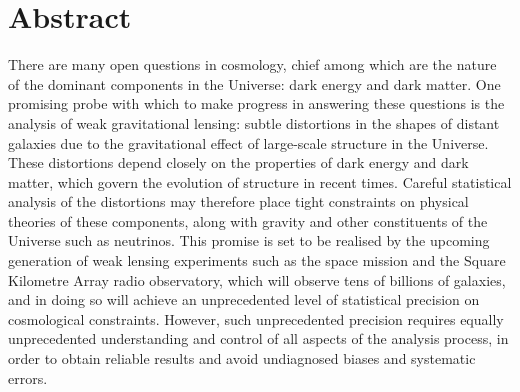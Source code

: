 \chapter*{Abstract}

\vspace{-.3em} %

There are many open questions in cosmology, chief among which are the nature of the dominant components in the Universe: dark energy and dark matter. One promising probe with which to make progress in answering these questions is the analysis of weak gravitational lensing: subtle distortions in the shapes of distant galaxies due to the gravitational effect of large-scale structure in the Universe. These distortions depend closely on the properties of dark energy and dark matter, which govern the evolution of structure in recent times. Careful statistical analysis of the distortions may therefore place tight constraints on physical theories of these components, along with gravity and other constituents of the Universe such as neutrinos. This promise is set to be realised by the upcoming generation of weak lensing experiments such as the \Euclid{} space mission and the Square Kilometre Array radio observatory, which will observe tens of billions of galaxies, and in doing so will achieve an unprecedented level of statistical precision on cosmological constraints. However, such unprecedented precision requires equally unprecedented understanding and control of all aspects of the analysis process, in order to obtain reliable results and avoid undiagnosed biases and systematic errors.

